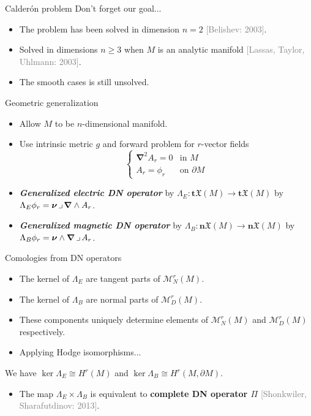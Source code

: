 \documentclass[aspectratio=169,handout]{beamer}
\newcommand\boldgreen[1]{\textcolor{lighter_csu_green}{\emph{\textbf{#1}}}}
\newcommand\boldgold[1]{\textcolor{csu_gold}{\textbf{#1}}}
\newcommand\grey[1]{\textcolor{gray}{#1}}
\newcommand{\tangentpart}{\boldsymbol{t}}
\newcommand{\normalpart}{\boldsymbol{n}}
\newcommand{\grad}{\boldsymbol{\nabla}}
\newcommand{\monogenics}{\mathcal{M}}
\newcommand{\blade}[1]{\boldsymbol{#1}}
\newcommand{\boundary}{{\partial M}}
\newcommand{\normal}{\blade{\nu}}
\newcommand{\contract}{\hspace*{.5mm} \lrcorner \hspace*{.5mm}}
\newcommand{\smoothfields}{\mathfrak{X}}
\begin{document}
\begin{frame}{Calder\'on problem}
\vfill
Don't forget our goal...
\begin{itemize}
\pause
    \item The problem has been solved in dimension $n=2$ \grey{[Belishev: 2003]}.
\pause
    \item Solved in dimensions $n\geq 3$ when $M$ is an analytic manifold \grey{[Lassas, Taylor, Uhlmann: 2003]}.
\pause
\item The smooth cases is still unsolved.
\end{itemize}
\vfill
\end{frame}


\begin{frame}{Geometric generalization}
\vfill
\begin{itemize}
\pause
\item Allow $M$ to be $n$-dimensional manifold.
\pause
\item Use intrinsic metric $g$ and forward problem for $r$-vector fields
\[
\begin{cases}
\grad^2 A_r = 0 & \textrm{in $M$}\\
A_r = \phi_r & \textrm{on $\partial M$}
\end{cases}
\]
\pause
\item \boldgreen{Generalized electric DN operator} by $\Lambda_E \colon \tangentpart \smoothfields(M) \to \tangentpart \smoothfields(M)$ by $\Lambda_E \phi_r = \normal \contract \grad \wedge A_r$.
\pause
\item \boldgreen{Generalized magnetic DN operator} by $\Lambda_B \colon \normalpart \smoothfields(M) \to \normalpart \smoothfields(M)$ by $\Lambda_B \phi_r = \normal \wedge \grad \contract A_r$.
\end{itemize}
\vfill
\end{frame}


\begin{frame}{Comologies from DN operators}
\vfill
\begin{itemize}
\pause
\item The kernel of $\Lambda_E$ are tangent parts of $\monogenics_N^r(M)$.
\pause
\item The kernel of $\Lambda_B$ are normal parts of $\monogenics_D^r(M)$.
\pause
\item These components uniquely determine elements of $\monogenics_N^r(M)$ and $\monogenics_D^r(M)$ respectively.
\pause
\item Applying Hodge isomorphisms...
\end{itemize}
\begin{thm*}{}{}
We have $\ker \Lambda_E \cong H^r(M)$ and $\ker \Lambda_B \cong H^r(M,\boundary)$.
\end{thm*}
\begin{itemize}
  \item The map $\Lambda_E \times \Lambda_B$ is equivalent to \boldgold{complete DN operator $\Pi$} \grey{[Shonkwiler, Sharafutdinov: 2013]}.
\end{itemize}
\vfill
\end{frame}
\end{document}

